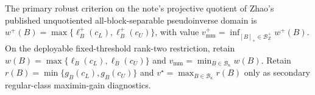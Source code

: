 The primary robust criterion on the note's projective quotient of Zhao's published unquotiented all-block-separable pseudoinverse domain is \(w^+(B)=\max\{\ell_B^+(c_L),\ell_B^+(c_U)\}\), with value \(v_{\mathrm{mm}}^+=\inf_{[B]_+\in\mathcal B_Z^+}w^+(B)\).  On the deployable fixed-threshold rank-two restriction, retain \(w(B)=\max\{\ell_B(c_L),\ell_B(c_U)\}\) and \(v_{\mathrm{mm}}=\min_{B\in\mathcal B_\kappa}w(B)\).  Retain \(r(B)=\min\{g_B(c_L),g_B(c_U)\}\) and \(v^\star=\max_{B\in\mathcal B_\kappa}r(B)\) only as secondary regular-class maximin-gain diagnostics.